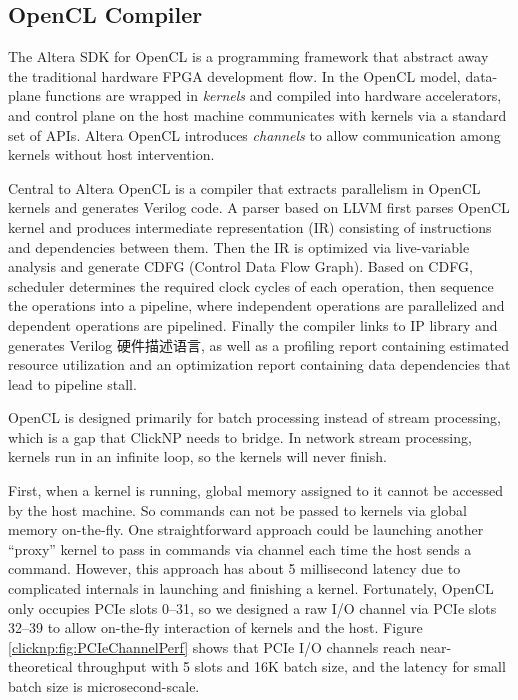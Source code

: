 {\subsection{OpenCL Compiler}

The Altera SDK for OpenCL \cite{singh2011implementing} is a programming framework that abstract away the traditional hardware FPGA development flow. In the OpenCL \cite{khronos2008opencl} model, data-plane functions are wrapped in \textit{kernels} and compiled into hardware accelerators, and control plane on the host machine communicates with kernels via a standard set of APIs. Altera OpenCL introduces \textit{channels} to allow communication among kernels without host intervention.

Central to Altera OpenCL is a compiler \cite{czajkowski2012opencl} that extracts parallelism in OpenCL kernels and generates Verilog code. A parser based on LLVM first parses OpenCL kernel and produces intermediate representation (IR) consisting of instructions and dependencies between them. Then the IR is optimized via live-variable analysis and generate CDFG (Control Data Flow Graph). Based on CDFG, scheduler determines the required clock cycles of each operation, then sequence the operations into a pipeline, where independent operations are parallelized and dependent operations are pipelined. Finally the compiler links to IP library and generates Verilog 硬件描述语言, as well as a profiling report containing estimated resource utilization and an optimization report containing data dependencies that lead to pipeline stall.

OpenCL is designed primarily for batch processing instead of stream processing, which is a gap that ClickNP needs to bridge. In network stream processing, kernels run in an infinite loop, so the kernels will never finish.

First, when a kernel is running, global memory assigned to it cannot be accessed by the host machine. So commands can not be passed to kernels via global memory on-the-fly. One straightforward approach could be launching another ``proxy'' kernel to pass in commands via channel each time the host sends a command. However, this approach has about 5 millisecond latency due to complicated internals in launching and finishing a kernel. Fortunately, OpenCL only occupies PCIe slots 0--31, so we designed a raw I/O channel via PCIe slots 32--39 to allow on-the-fly interaction of kernels and the host. Figure \ref{clicknp:fig:PCIeChannelPerf} shows that PCIe I/O channels reach near-theoretical throughput with 5 slots and 16K batch size, and the latency for small batch size is microsecond-scale.

}
